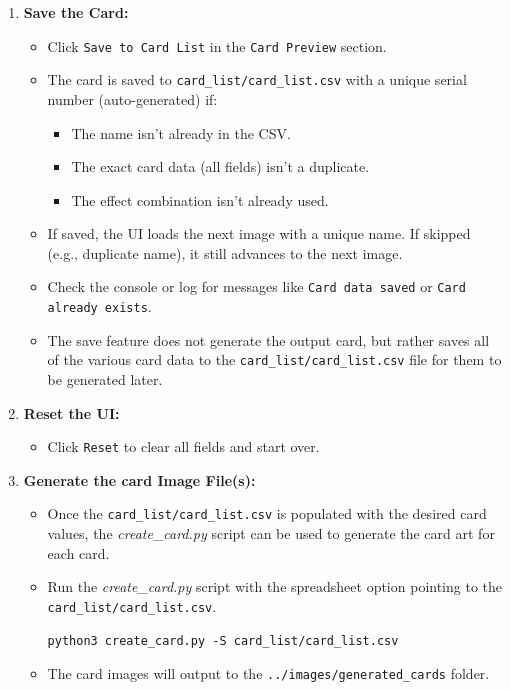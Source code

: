 \begin{enumerate}
    \item \textbf{Save the Card:}
          \begin{itemize}
              \item Click \texttt{Save to Card List} in the \texttt{Card Preview} section.
              \item The card is saved to \texttt{card\_list/card\_list.csv} with a unique serial number (auto-generated) if:
                    \begin{itemize}
                        \item The name isn’t already in the CSV.
                        \item The exact card data (all fields) isn’t a duplicate.
                        \item The effect combination isn’t already used.
                    \end{itemize}
              \item If saved, the UI loads the next image with a unique name. If skipped (e.g., duplicate name), it still advances to the next image.
              \item Check the console or log for messages like \texttt{Card data saved} or \texttt{Card already exists}.
              \item The save feature does not generate the output card, but rather saves all of the various card data to the \texttt{card\_list/card\_list.csv} file for them to be generated later.
          \end{itemize}

    \item \textbf{Reset the UI:}
          \begin{itemize}
              \item Click \texttt{Reset} to clear all fields and start over.
          \end{itemize}
          
	\item \textbf{Generate the card Image File(s):}
	    \begin{itemize}
	        \item Once the \texttt{card\_list/card\_list.csv} is populated with the desired card values, the \textit{create\_card.py} script can be used to generate the card art for each card.
	        \item Run the \textit{create\_card.py} script with the spreadsheet option pointing to the \texttt{card\_list/card\_list.csv}.
\begin{lstlisting}[style=terminalstyle]
python3 create_card.py -S card_list/card_list.csv
\end{lstlisting}
			\item The card images will output to the \texttt{../images/generated\_cards} folder.
	    \end{itemize}
\end{enumerate}

